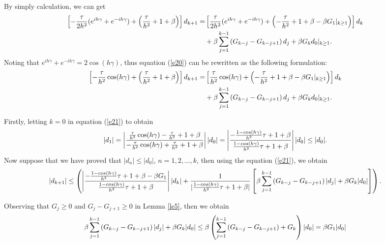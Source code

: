 \documentclass[3p,times]{elsarticle}
\begin{document}
By simply calculation, we can get
\begin{equation}\label{e20}
\aligned
\left[-\frac{\tau}{2h^2}(e^{ih\gamma}+e^{-ih\gamma})+\left(\frac{\tau}{h^2}+1+\beta\right)\right]d_{k+1}
=&\left[\frac{\tau}{2h^2}(e^{ih\gamma}+e^{-ih\gamma})+\left(-\frac{\tau}{h^2}+1+\beta-\beta G_1|_{k\geq1}\right)\right]d_k\\
&+\beta\sum\limits_{j=1}^{k-1}\left(G_{k-j}-G_{k-j+1}\right)d_{j}+\beta G_kd_{0}|_{k\geq1}.
\endaligned
\end{equation}
Noting that $e^{ih\gamma}+e^{-ih\gamma}=2\cos(h\gamma)$, thus equation (\ref{e20}) can be rewritten as the following formulation:
\begin{equation}\label{e21}
\aligned
\left[-\frac{\tau}{h^2}\cos(h\gamma)+\left(\frac{\tau}{h^2}+1+\beta\right)\right]d_{k+1}
=&\left[\frac{\tau}{h^2}\cos(h\gamma)+\left(-\frac{\tau}{h^2}+1+\beta-\beta G_1|_{k\geq1}\right)\right]d_k\\
&+\beta\sum\limits_{j=1}^{k-1}\left(G_{k-j}-G_{k-j+1}\right)d_{j}+\beta G_kd_{0}|_{k\geq1}.
\endaligned
\end{equation}

Firstly, letting $k=0$ in equation (\ref{e21}) to obtain
\begin{equation}\label{e22}
\aligned
\displaystyle|d_1|=\left|\frac{\frac{\tau}{h^2}\cos(h\gamma)-\frac{\tau}{h^2}+1+\beta}{-\frac{\tau}{h^2}\cos(h\gamma)+\frac{\tau}{h^2}+1+\beta}\right||d_0|
=\left|\frac{-\frac{1-cos(h\gamma)}{h^2}\tau+1+\beta}{\frac{1-cos(h\gamma)}{h^2}\tau+1+\beta}\right||d_0|\leq|d_0|.
\endaligned
\end{equation}
Now suppose that we have proved that $|d_n|\leq|d_0|$, $n=1,2,\ldots,k$, then using the equation (\ref{e21}), we obtain
\begin{equation}\label{e23}
\aligned
\displaystyle|d_{k+1}|\leq\left(\left|\frac{-\frac{1-cos(h\gamma)}{h^2}\tau+1+\beta-\beta G_1}{\frac{1-cos(h\gamma)}{h^2}\tau+1+\beta}\right||d_k|+\frac{1}{|\frac{1-cos(h\gamma)}{h^2}\tau+1+\beta|}\left[\beta\sum\limits_{j=1}^{k-1}\left(G_{k-j}-G_{k-j+1}\right)|d_j|+\beta G_k|d_0|\right]\right).
\endaligned
\end{equation}

Observing that $G_j\geq0$ and $G_j-G_{j+1}\geq0$ in Lemma \ref{le5}, then we obtain
\begin{equation}\label{e24}
\aligned
\beta\sum\limits_{j=1}^{k-1}\left(G_{k-j}-G_{k-j+1}\right)|d_j|+\beta G_k|d_0|\leq\beta\left(\sum\limits_{j=1}^{k-1}\left(G_{k-j}-G_{k-j+1}\right)+G_k\right)|d_0|=\beta G_1|d_0|
\endaligned
\end{equation}
\end{document}
